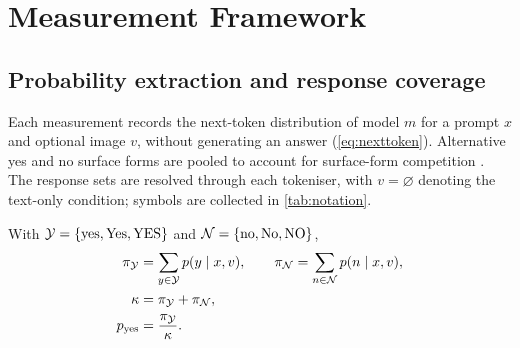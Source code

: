 \chapter{Measurement Framework}\label{ch:framework}


\section{Probability extraction and response coverage}\label{sec:framework-setting}\label{sec:framework-probe}

Each measurement records the next-token distribution of model $m$ for a
prompt $x$ and optional image $v$, without generating an answer
(\cref{eq:nexttoken}). Alternative yes and no surface forms are pooled
to account for surface-form competition \cite{holtzman2021surface}.
The response sets are resolved through each tokeniser, with $v=\varnothing$
denoting the text-only condition; symbols are collected in \cref{tab:notation}.

\begin{definition}\label{def:pooled}
With $\mathcal{Y}=\{\text{yes},\text{Yes},\text{YES}\}$ and
$\mathcal{N}=\{\text{no},\text{No},\text{NO}\}$,
\begin{align}
  \pi_{\mathcal{Y}} &= \sum_{y\in\mathcal{Y}} p(y\mid x,v), \qquad
  \pi_{\mathcal{N}} = \sum_{n\in\mathcal{N}} p(n\mid x,v), \label{eq:pooled}\\
  \kappa &= \pi_{\mathcal{Y}} + \pi_{\mathcal{N}}, \label{eq:capm}\\
  p_{\mathrm{yes}} &= \frac{\pi_{\mathcal{Y}}}{\kappa}.
  \label{eq:pyes}
\end{align}
\end{definition}

